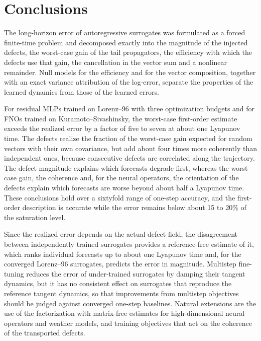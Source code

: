\section{Conclusions}
\label{sec:conclusions}

The long-horizon error of autoregressive surrogates was formulated as a forced finite-time problem and decomposed exactly into the magnitude of the injected defects, the worst-case gain of the tail propagators, the efficiency with which the defects use that gain, the cancellation in the vector sum and a nonlinear remainder. Null models for the efficiency and for the vector composition, together with an exact variance attribution of the log-error, separate the properties of the learned dynamics from those of the learned errors.

For residual MLPs trained on Lorenz--96 with three optimization budgets and for FNOs trained on Kuramoto--Sivashinsky, the worst-case first-order estimate exceeds the realized error by a factor of five to seven at about one Lyapunov time. The defects realize the fraction of the worst-case gain expected for random vectors with their own covariance, but add about four times more coherently than independent ones, because consecutive defects are correlated along the trajectory. The defect magnitude explains which forecasts degrade first, whereas the worst-case gain, the coherence and, for the neural operators, the orientation of the defects explain which forecasts are worse beyond about half a Lyapunov time. These conclusions hold over a sixtyfold range of one-step accuracy, and the first-order description is accurate while the error remains below about 15 to 20\% of the saturation level.

Since the realized error depends on the actual defect field, the disagreement between independently trained surrogates provides a reference-free estimate of it, which ranks individual forecasts up to about one Lyapunov time and, for the converged Lorenz--96 surrogates, predicts the error in magnitude. Multistep fine-tuning reduces the error of under-trained surrogates by damping their tangent dynamics, but it has no consistent effect on surrogates that reproduce the reference tangent dynamics, so that improvements from multistep objectives should be judged against converged one-step baselines. Natural extensions are the use of the factorization with matrix-free estimates for high-dimensional neural operators and weather models, and training objectives that act on the coherence of the transported defects.
